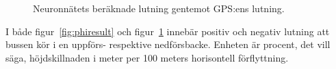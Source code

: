 \begin{figure}
	\centering
	\caption{Neuronnätets beräknade lutning gentemot GPS:ens lutning. \label{fig:netresult}}
\end{figure}

I både figur~\ref{fig:phiresult} och figur~\ref{fig:netresult} innebär
positiv och negativ lutning att bussen kör i en uppförs- respektive nedförsbacke.
Enheten är procent, det vill säga,
höjdskillnaden i meter per 100 meters horisontell förflyttning.

